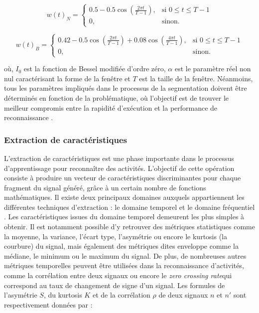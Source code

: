 \begin{equation}
	\label{eq:hann}
	w\left(t\right)_N = \left\{
	\begin{array}{ll}
		0.5-0.5\cos(\frac{2\pi t}{T-1}), & \mbox{si } 0 \leq t \leq T-1 \\
		0, & \mbox{sinon.}
	\end{array}
	\right.
\end{equation}

\begin{equation}
	\label{eq:blackman}
	w\left(t\right)_B = \left\{
	\begin{array}{ll}
		0.42-0.5\cos(\frac{2\pi t}{T-1}) + 0.08\cos(\frac{4\pi t}{T-1}), & \mbox{si } 0 \leq t \leq T-1 \\
		0,                                    & \mbox{sinon.}
	\end{array}
	\right.
\end{equation}

\noindent où, $I_0 $ est la fonction de Bessel modifiée d’ordre zéro, $\alpha$ est le paramètre réel non nul caractérisant la forme de la fenêtre et $T$ est la taille de la fenêtre. Néanmoins, tous les paramètres impliqués dans le processus de la segmentation doivent être déterminés en fonction de la problématique, où l'objectif est de trouver le meilleur compromis entre la rapidité d'exécution et la performance de reconnaissance \citep{Banos2014}.

\subsubsection{Extraction de caractéristiques}

L'extraction de caractéristiques est une phase importante dans le processus d'apprentissage pour reconnaître des activités. L'objectif de cette opération consiste à produire un vecteur de caractéristiques discriminantes pour chaque fragment du signal généré, grâce à un certain nombre de fonctions mathématiques. Il existe deux principaux domaines auxquels appartiennent les différentes techniques d'extraction : le domaine temporel et le domaine fréquentiel \citep{Huynh2005, Figo2010, Cleland2013}. Les caractéristiques issues du domaine temporel demeurent les plus simples à obtenir. Il est notamment possible d'y retrouver des métriques statistiques comme la moyenne, la variance, l'écart type, l'asymétrie ou encore le kurtosis (la courbure) du signal, mais également des métriques dites \og enveloppe \fg comme la médiane, le minimum ou le maximum du signal. De plus, de nombreuses autres métriques temporelles peuvent être utilisées dans la reconnaissance d'activités, comme la corrélation entre deux signaux ou encore le \textit{zero crossing rate}\textemdash qui correspond au taux de changement de signe d'un signal. Les formules de l'asymétrie $S$, du kurtosis $K$ et de la corrélation $\rho$ de deux signaux $n \mbox{ et } n'$ sont respectivement données par :


